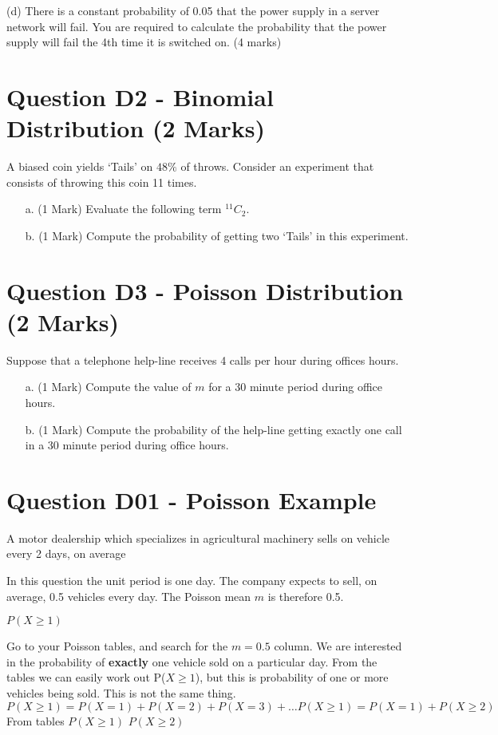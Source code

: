 \documentclass[]{report}
\begin{document}
(d)	There is a constant probability of 0.05 that the power supply in a server network will fail.  You are required to calculate the probability that the power supply will fail the 4th time it is switched on.
(4 marks)

\section{Question D2 - Binomial Distribution (2 Marks) } %
A biased coin yields `Tails' on $48\%$ of throws. Consider an experiment that consists of throwing this coin 11 times.
\begin{itemize}
	\item[a.] (1 Mark) Evaluate the following term $^{11}C_2$.
	\item[b.] (1 Mark) Compute the probability of getting two `Tails' in this experiment.
\end{itemize}
\section{Question D3 -  Poisson Distribution (2 Marks) }  %
Suppose that a telephone help-line receives 4 calls per hour during offices hours.
\begin{itemize}
	\item[a.] (1 Mark) Compute the value of $m$ for a 30 minute period during office hours.
	\item[b.] (1 Mark) Compute the probability of the help-line getting exactly one call in a 30 minute period during office hours.
\end{itemize}
\section{Question D01  - Poisson Example}
A motor dealership which specializes in agricultural machinery sells on vehicle every 2 days, on average

In this question the unit period is one day. The company expects to sell, on average, 0.5 vehicles every day.
The Poisson mean $m$ is therefore 0.5.

$P(X \geq 1)$

Go to your Poisson tables, and search for the $m=0.5$ column.
We are interested in the probability of \textbf{exactly} one vehicle sold on a particular day.
From the tables we can easily work out P($X \geq 1$), but this is probability of one or more vehicles being sold.
This is not the same thing.
\[P(X \geq 1) = P(X =1) + P( X=2) + P(X=3) + \ldots
P(X \geq 1) = P(X=1) + P(X \geq 2)\]
From tables
$P(X \geq 1)$
$P(X \geq 2)$
\end{document}
